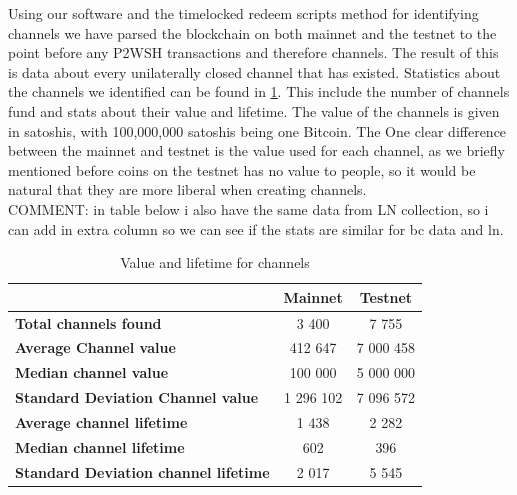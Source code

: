 Using our software and the timelocked redeem scripts method for identifying channels we have parsed the blockchain on both mainnet and the testnet to the point before any P2WSH transactions and therefore channels. The result of this is data about every unilaterally closed channel that has existed. Statistics about the channels we identified can be found in \cref{subgraph_stats}. This include the number of channels fund and stats about their value and lifetime. The value of the channels is given in satoshis, with 100,000,000 satoshis being one Bitcoin. The One clear difference between the mainnet and testnet is the value used for each channel, as we briefly mentioned before coins on the testnet has no value to people, so it would be natural that they are more liberal when creating channels. 
\\

COMMENT: in table below i also have the same data from LN collection, so i can add in extra column so we can see if the stats are similar for bc data and ln.

\begin{table}[]
\centering
\caption{Value and lifetime for channels}
\label{subgraph_stats}
\begin{tabular}{|l|c|c|}
\hline
                                             & \textbf{Mainnet} & \textbf{Testnet} \\ \hline
\textbf{Total channels found}                & 3 400            & 7 755            \\ \hline
\textbf{Average Channel value}               & 412 647          & 7 000 458        \\ \hline
\textbf{Median channel value}                & 100 000          & 5 000 000        \\ \hline
\textbf{Standard Deviation Channel value}    & 1 296 102        & 7 096 572        \\ \hline
\textbf{Average channel lifetime}            & 1 438            & 2 282            \\ \hline
\textbf{Median channel lifetime}             & 602              & 396              \\ \hline
\textbf{Standard Deviation channel lifetime} & 2 017            & 5 545            \\ \hline
\end{tabular}
\end{table}


